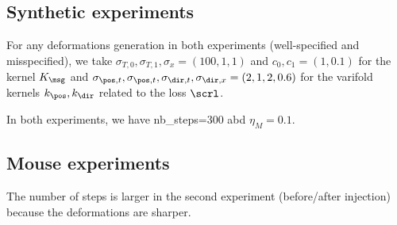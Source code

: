 \begin{table}[t]
  \vspace{-0.5em}
  \caption{Classification results in f1-score (U: unsupervised, S: supervised, DL: deep learning, ML: machine learning). \textbf{x} best unsupervised method, \underline{x} best supervised method.}
\vspace{-2em}
  \end{table}



  \subsection{Synthetic experiments}
\label{appendix:numerics_synthetic}
For any deformations generation in both experiments (well-specified and misspecified), we take $\sigma_{T,0},\sigma_{T,1},\sigma_x=(100,1,1)$ and $c_0,c_1=(1,0.1)$ for the kernel $K_\msg$
and $\sigma_{\pos,t}, \sigma_{\pos,t}, \sigma_{\dir,t}, \sigma_{\dir,x}=(2,1,2,0.6) $ for the varifold kernels $k_\pos,k_\dir$ related to the loss $\scrl$.

In both experiments, we have nb\_steps=300 abd $\eta_M=0.1$.

\subsection{Mouse experiments}
The number of steps is larger in the second experiment (before/after injection) because the deformations are sharper.

